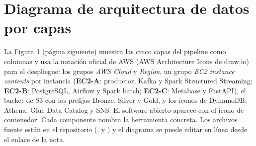 \documentclass[12pt,letterpaper]{article}
\begin{document}
\section{Diagrama de arquitectura de datos por capas}

La Figura 1 (página siguiente) muestra las cinco capas del pipeline como columnas y usa la notación oficial de AWS (AWS Architecture Icons de draw.io) para el despliegue: los grupos \emph{AWS Cloud} y \emph{Region}, un grupo \emph{EC2 instance contents} por instancia (\textbf{EC2-A}: productor, Kafka y Spark Structured Streaming; \textbf{EC2-B}: PostgreSQL, Airflow y Spark batch; \textbf{EC2-C}: Metabase y FastAPI), el bucket de S3 con los prefijos Bronze, Silver y Gold, y los íconos de DynamoDB, Athena, Glue Data Catalog y SNS. El software abierto aparece con el ícono de contenedor. Cada componente nombra la herramienta concreta. Los archivos fuente están en el repositorio (,  y ) y el diagrama se puede editar en línea desde el enlace de la nota.
\end{document}
